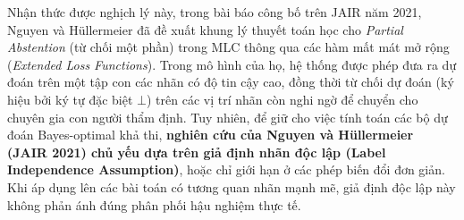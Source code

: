 \documentclass[11pt,a4paper]{article}
\begin{document}
Nhận thức được nghịch lý này, trong bài báo công bố trên JAIR năm 2021, Nguyen và H\"ullermeier \cite{nguyen2021multilabel} đã đề xuất khung lý thuyết toán học cho \textit{Partial Abstention} (từ chối một phần) trong MLC thông qua các hàm mất mát mở rộng (\textit{Extended Loss Functions}). Trong mô hình của họ, hệ thống được phép đưa ra dự đoán trên một tập con các nhãn có độ tin cậy cao, đồng thời từ chối dự đoán (ký hiệu bởi ký tự đặc biệt $\bot$) trên các vị trí nhãn còn nghi ngờ để chuyển cho chuyên gia con người thẩm định. Tuy nhiên, để giữ cho việc tính toán các bộ dự đoán Bayes-optimal khả thi, \textbf{nghiên cứu của Nguyen và H\"ullermeier (JAIR 2021) chủ yếu dựa trên giả định nhãn độc lập (Label Independence Assumption)}, hoặc chỉ giới hạn ở các phép biến đổi đơn giản. Khi áp dụng lên các bài toán có tương quan nhãn mạnh mẽ, giả định độc lập này không phản ánh đúng phân phối hậu nghiệm thực tế.
\end{document}

